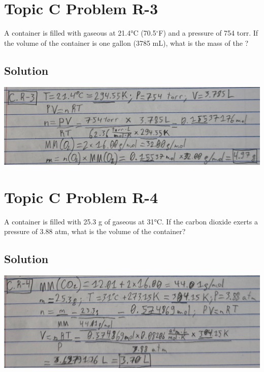 \documentclass[10pt]{article}
\begin{document}
    \pagebreak
    \section{Topic C Problem R-3}
        A container is filled with gaseous  at 21.4\unit{\celsius} (70.5$^\circ$F) and a pressure of 754 torr. 
        If the volume of the container is one gallon (3785 mL), what is the mass of the ?

        \subsection{Solution}
            \begin{center}
                \includegraphics[width=\textwidth]{Answers Images/answer_C_R-3.jpg}
            \end{center}

    \pagebreak
    \section{Topic C Problem R-4}
        A container is filled with 25.3 g of gaseous  at 31\unit{\celsius}. 
        If the carbon dioxide exerts a pressure of 3.88 atm, what is the volume of the container?

        \subsection{Solution}
            \begin{center}
                \includegraphics[width=\textwidth]{Answers Images/answer_C_R-4.jpg}
            \end{center}
\end{document}
